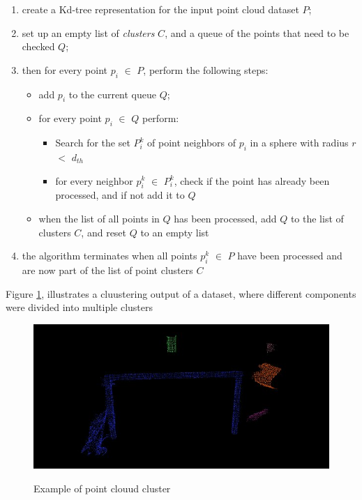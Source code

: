 \documentclass[12pt]{report}
\begin{document}
\begin{enumerate}
  \item create a Kd-tree representation for the input point cloud dataset $P$;
  \item set up an empty list of \textit{clusters} $C$, and a queue of the points that need to be checked $Q$;
  \item then for every point $p_i$ $\in$ $P$, perform the following steps:
  \begin{itemize}
    \item add $p_i$ to the current queue $Q$;
    \item for every point $p_i$ $\in$ $Q$ perform:
    \begin{itemize}
      \item Search for the set $P_{i}^{k}$ of point neighbors of $p_i$ in a sphere with radius $r$ $<$ $d_{th}$
      \item for every neighbor $p_{i}^{k}$ $\in$ $P_{i}^{k}$, check if the point has already been processed, and if not add it to $Q$
    \end{itemize}
    \item when the list of all points in $Q$ has been processed, add $Q$ to the list of clusters $C$, and reset $Q$ to an empty list

  \end{itemize}
  \item the algorithm terminates when all points $p_{i}^{k}$ $\in$ $P$ have been processed and are now part of the list of point clusters $C$
\end{enumerate}

Figure \ref{fig:cluster_example}, illustrates a cluustering output of a dataset, where different components were divided into multiple clusters
\begin{figure}[H]%
  \centering
  \includegraphics[width=1\textwidth]{cluster_extraction.jpg}
 \caption{Example of point clouud cluster}\cite[]{Rusu_ICRA2011_PCL}
 \label{fig:cluster_example} 
\end{figure}
\end{document}
